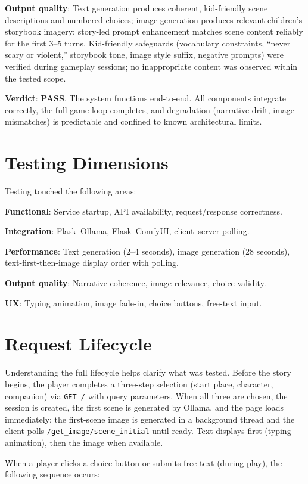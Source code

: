\documentclass[12pt,a4paper]{article}
\begin{document}
\textbf{Output quality}: Text generation produces coherent, kid-friendly scene descriptions and numbered choices; image generation produces relevant children's storybook imagery; story-led prompt enhancement matches scene content reliably for the first 3--5 turns. Kid-friendly safeguards (vocabulary constraints, ``never scary or violent,'' storybook tone, image style suffix, negative prompts) were verified during gameplay sessions; no inappropriate content was observed within the tested scope.

\textbf{Verdict}: \textbf{PASS}. The system functions end-to-end. All components integrate correctly, the full game loop completes, and degradation (narrative drift, image mismatches) is predictable and confined to known architectural limits.

\section{Testing Dimensions}

Testing touched the following areas:

\textbf{Functional}: Service startup, API availability, request/response correctness.

\textbf{Integration}: Flask--Ollama, Flask--ComfyUI, client--server polling.

\textbf{Performance}: Text generation (2--4 seconds), image generation (28 seconds), text-first-then-image display order with polling.

\textbf{Output quality}: Narrative coherence, image relevance, choice validity.

\textbf{UX}: Typing animation, image fade-in, choice buttons, free-text input.

\section{Request Lifecycle}

Understanding the full lifecycle helps clarify what was tested. Before the story begins, the player completes a three-step selection (start place, character, companion) via \texttt{GET /} with query parameters. When all three are chosen, the session is created, the first scene is generated by Ollama, and the page loads immediately; the first-scene image is generated in a background thread and the client polls \texttt{/get\_image/scene\_initial} until ready. Text displays first (typing animation), then the image when available.

When a player clicks a choice button or submits free text (during play), the following sequence occurs:
\end{document}
